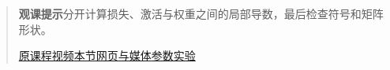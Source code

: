 \begin{quote}\small\textbf{观课提示}\quad 分开计算损失、激活与权重之间的局部导数，最后检查符号和矩阵形状。

\href{https://www.youtube.com/watch?v=tIeHLnjs5U8}{原课程视频}\quad\href{https://vitael04213.github.io/3blue1brown-notes/lessons/backpropagation-calculus.html}{本节网页与媒体}\quad\href{https://vitael04213.github.io/3blue1brown-notes/lab.html\#network}{参数实验}
\end{quote}
